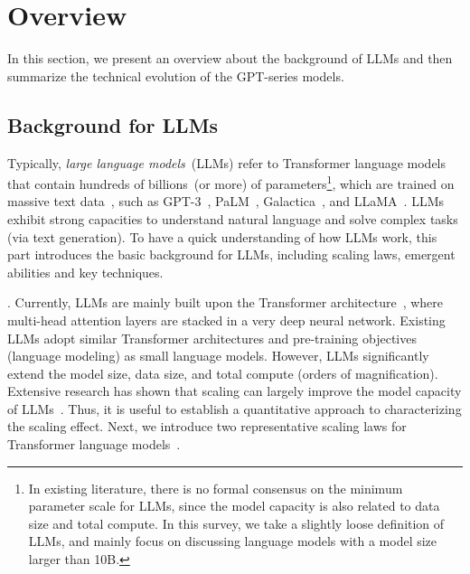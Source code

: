 \section{Overview}
\label{sec-overview}
In this section, we present an overview  about the background of LLMs and then summarize the 
technical evolution of the GPT-series models.




\subsection{Background for LLMs}\label{sec-background}

Typically, \emph{large language models}~(LLMs) refer to Transformer language models 
that contain hundreds of billions~(or more) of parameters\footnote{In existing literature, there is no formal consensus on the minimum parameter scale for LLMs, since the model capacity is also related to  data size and total compute. In this survey, we take a slightly loose definition of LLMs, and mainly focus on discussing language models  with a model size larger than 10B. }, which are trained on massive text  data~\cite{Shanahan-arxiv-2022-Talking}, such as GPT-3~\cite{Brown-NeurIPS-2020-Language}, PaLM~\cite{Chowdhery-arxiv-2022-PaLM},  Galactica~\cite{Taylor-arxiv-2022-Galactica}, and LLaMA~\cite{Touvron-arxiv-2023-LLaMA}.  LLMs exhibit strong capacities to understand natural language and solve complex tasks (via text generation). To have a quick understanding of how LLMs work, this part introduces the basic background for LLMs, including scaling laws, emergent abilities and key techniques.   


. Currently, LLMs are mainly built upon the Transformer architecture~\cite{Vaswani-NIPS-2017-Attention}, where  multi-head attention layers are stacked in a very deep neural network. 
Existing LLMs  adopt   similar Transformer architectures and pre-training objectives (\eg language modeling) as  small language models. 
However, LLMs significantly extend the model size, data size, and total compute (orders of magnification). Extensive research has shown that scaling can largely improve the model capacity of LLMs~\cite{radford-blog-2019-language,Brown-NeurIPS-2020-Language,Chowdhery-arxiv-2022-PaLM}. Thus, it is useful to establish a quantitative approach to characterizing the scaling effect. 
Next, we introduce two representative scaling laws for Transformer language models~\cite{Kaplan-arxiv-2020-Scaling,Hoffmann-arxiv-2022-Training}.


